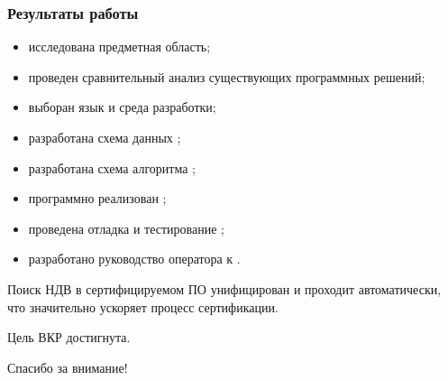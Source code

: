 \begin{frame}%
\frametitle{Результаты работы}
    \begin{itemize}
        \item исследована предметная область;
        \item проведен сравнительный анализ существующих программных решений;
        \item выборан язык и среда разработки;
        \item разработана схема данных {\ProgModule};
        \item разработана схема алгоритма {\ProgModule};
        \item программно реализован {\ProgModule};
        \item проведена отладка и тестирование {\ProgModule};
        \item разработано руководство оператора к {\ProgModule}.
    \end{itemize}

    Поиск НДВ в сертифицируемом ПО унифицирован и проходит автоматически,
    что значительно ускоряет процесс сертификации.
    
    Цель ВКР достигнута.
\end{frame}

\begin{frame}%

    \begin{center}
        \Huge Спасибо за внимание!
    \end{center}
    
\end{frame}
